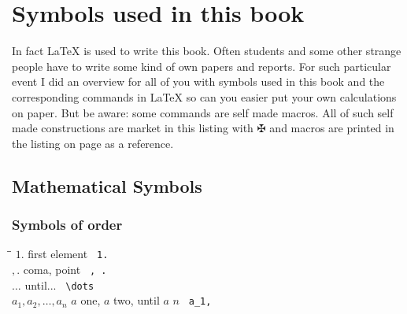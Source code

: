 \newcommand{\mySymbols}{\hspace*{0.2\textwidth}\=\hspace*{0.5\textwidth}\=\hspace*{0.2\textwidth}\kill}

\section{Symbols used in this book}
In fact \LaTeX\; is used to write this book. Often students and some other strange people have to write some kind of own papers and reports. For such particular event I did an overview for all of you with symbols used in this book and the corresponding commands in \LaTeX\; so can you easier put your own calculations on paper. But be aware: some commands are self made macros. All of such self made constructions are market in this listing with $\maltese$ and macros are printed in the listing on page \pageref{DSmyMacro} as a reference.
\subsection{Mathematical Symbols}
\subsubsection{Symbols of order}

\begin{tabbing}
\mySymbols
$ {1.}$               \> first element                   \> \verb` 1. `    \\
$ {, .}$              \> coma, point                     \> \verb` , . `   \\
$ {\dots}$            \> until...                        \> \verb` \dots ` \\
$ a_1,a_2,\dots ,a_n$ \> $a$ one, $a$ two, until $a$ $n$ \> \verb` a_1, `  \\
\end{tabbing}

